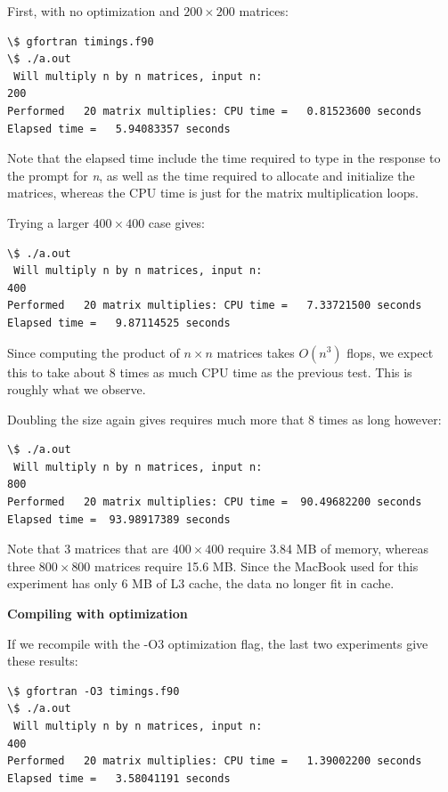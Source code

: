 \documentclass[letterpaper,10pt,english]{sphinxmanual}
\begin{document}
First, with no optimization and $200\times 200$ matrices:

\begin{Verbatim}[commandchars=\\\{\}]
\$ gfortran timings.f90
\$ ./a.out
 Will multiply n by n matrices, input n:
200
Performed   20 matrix multiplies: CPU time =   0.81523600 seconds
Elapsed time =   5.94083357 seconds
\end{Verbatim}

Note that the elapsed time include the time required to type in the response
to the prompt for \emph{n}, as well as the time required to allocate and
initialize the matrices, whereas the CPU time is just for the matrix
multiplication loops.

Trying a larger $400 \times 400$ case gives:

\begin{Verbatim}[commandchars=\\\{\}]
\$ ./a.out
 Will multiply n by n matrices, input n:
400
Performed   20 matrix multiplies: CPU time =   7.33721500 seconds
Elapsed time =   9.87114525 seconds
\end{Verbatim}

Since computing the product of $n \times n$ matrices takes
$O(n^3)$ flops,
we expect this to take about 8 times as much CPU time as the previous test.
This is roughly what we observe.

Doubling the size again gives requires much more that 8 times as long
however:

\begin{Verbatim}[commandchars=\\\{\}]
\$ ./a.out
 Will multiply n by n matrices, input n:
800
Performed   20 matrix multiplies: CPU time =  90.49682200 seconds
Elapsed time =  93.98917389 seconds
\end{Verbatim}

Note that 3 matrices that are $400\times 400$ require 3.84 MB of memory,
whereas three $800 \times 800$ matrices require 15.6 MB.  Since the MacBook
used for this experiment
has only 6 MB of L3 cache, the data no longer fit in cache.

\textbf{Compiling with optimization}

If we recompile with the -O3 optimization flag, the last two experiments
give these results:

\begin{Verbatim}[commandchars=\\\{\}]
\$ gfortran -O3 timings.f90
\$ ./a.out
 Will multiply n by n matrices, input n:
400
Performed   20 matrix multiplies: CPU time =   1.39002200 seconds
Elapsed time =   3.58041191 seconds
\end{Verbatim}
\end{document}

